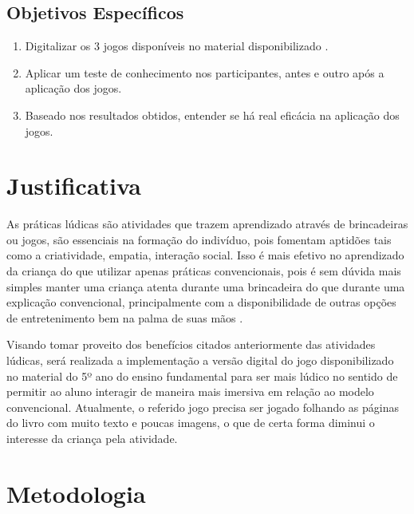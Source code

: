         \subsection{Objetivos Específicos}

            \begin{enumerate}[noitemsep,nosep,labelindent=\parindent,leftmargin=*,label={\alph*}) ]
                \item Digitalizar os 3 jogos disponíveis no material disponibilizado \cite{Educacao_financeira_nas_escolas}.
                \item Aplicar um teste de conhecimento nos participantes, antes e outro após a aplicação dos jogos.
                \item Baseado nos resultados obtidos, entender se há real eficácia na aplicação dos jogos.
            \end{enumerate}

    \section{Justificativa}

        As práticas lúdicas são atividades que trazem aprendizado através de brincadeiras ou jogos, são essenciais na
        formação do indivíduo, pois fomentam aptidões tais como a criatividade, empatia, interação social. Isso é mais
        efetivo no aprendizado da criança do que utilizar apenas práticas convencionais, pois é sem dúvida mais simples
        manter uma criança atenta durante uma brincadeira do que durante uma explicação convencional, principalmente com
        a disponibilidade de outras opções de entretenimento bem na palma de suas mãos \cite{Santos_Thayna_da_silva_2021}.

        Visando tomar proveito dos benefícios citados anteriormente das atividades lúdicas, será realizada a
        implementação a versão digital do jogo disponibilizado no material do 5º ano do ensino fundamental para ser mais
        lúdico no sentido de permitir ao aluno interagir de maneira mais imersiva em relação ao modelo convencional.
        Atualmente, o referido jogo precisa ser jogado folhando as páginas do livro com muito texto e poucas imagens, o
        que de certa forma diminui o interesse da criança pela atividade.

    \section{Metodologia}

